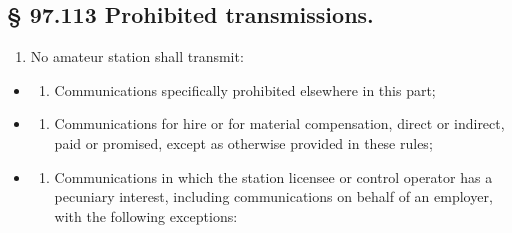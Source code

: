 \documentclass[
  letterpaper,
  DIV=11,
  numbers=noendperiod]{scrreport}
\providecommand{\tightlist}{%
  \setlength{\itemsep}{0pt}\setlength{\parskip}{0pt}}\usepackage{longtable,booktabs,array}
\begin{document}
\hypertarget{97.113}{%
\subsection*{§ 97.113 Prohibited transmissions.}\label{97.113}}

\begin{enumerate}
\def\labelenumi{(\alph{enumi})}
\tightlist
\item
  No amateur station shall transmit:
\end{enumerate}

\begin{itemize}
\item
  \begin{enumerate}
  \def\labelenumi{(\arabic{enumi})}
  \tightlist
  \item
    Communications specifically prohibited elsewhere in this part;
  \end{enumerate}
\item
  \begin{enumerate}
  \def\labelenumi{(\arabic{enumi})}
  \setcounter{enumi}{1}
  \tightlist
  \item
    Communications for hire or for material compensation, direct or
    indirect, paid or promised, except as otherwise provided in these
    rules;
  \end{enumerate}
\item
  \begin{enumerate}
  \def\labelenumi{(\arabic{enumi})}
  \setcounter{enumi}{2}
  \tightlist
  \item
    Communications in which the station licensee or control operator has
    a pecuniary interest, including communications on behalf of an
    employer, with the following exceptions:
  \end{enumerate}


\end{itemize}
\end{document}
